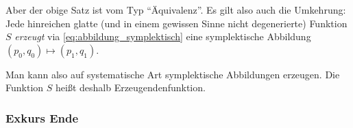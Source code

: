 Aber der obige Satz ist vom Typ \enquote{Äquivalenz}. Es gilt also auch die Umkehrung: Jede hinreichen glatte (und in einem gewissen Sinne nicht degenerierte) Funktion $S$ \emph{erzeugt} via \eqref{eq:abbildung_symplektisch} eine symplektische Abbildung $(p_0,q_0)\mapsto (p_1,q_1)$.

Man kann also auf systematische Art symplektische Abbildungen erzeugen. Die Funktion $S$ heißt deshalb Erzeugendenfunktion.

\subsubsection*{Exkurs Ende}





